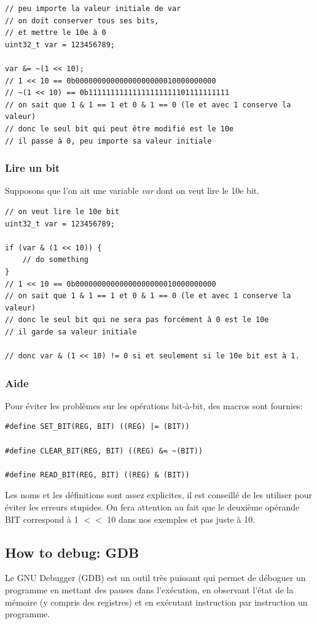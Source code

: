 \documentclass[a4paper,10pt]{article} %
\begin{document}
\begin{lstlisting}[frame=single]
// peu importe la valeur initiale de var
// on doit conserver tous ses bits,
// et mettre le 10e à 0
uint32_t var = 123456789;

var &= ~(1 << 10);
// 1 << 10 == 0b00000000000000000000010000000000
// ~(1 << 10) == 0b11111111111111111111101111111111
// on sait que 1 & 1 == 1 et 0 & 1 == 0 (le et avec 1 conserve la valeur)
// donc le seul bit qui peut être modifié est le 10e
// il passe à 0, peu importe sa valeur initiale
\end{lstlisting}

\subsubsection{Lire un bit}
Supposons que l'on ait une variable \textit{var} dont on veut lire le 10e bit.

\begin{lstlisting}[frame=single]
// on veut lire le 10e bit
uint32_t var = 123456789;

if (var & (1 << 10)) {
    // do something
}
// 1 << 10 == 0b00000000000000000000010000000000
// on sait que 1 & 1 == 1 et 0 & 1 == 0 (le et avec 1 conserve la valeur)
// donc le seul bit qui ne sera pas forcément à 0 est le 10e
// il garde sa valeur initiale

// donc var & (1 << 10) != 0 si et seulement si le 10e bit est à 1.
\end{lstlisting}

\subsubsection{Aide}
Pour éviter les problèmes sur les opérations bit-à-bit, des macros sont fournies:

\begin{lstlisting}[frame=single]
#define SET_BIT(REG, BIT) ((REG) |= (BIT))

#define CLEAR_BIT(REG, BIT) ((REG) &= ~(BIT))

#define READ_BIT(REG, BIT) ((REG) & (BIT))
\end{lstlisting}

Les noms et les définitions sont assez explicites, il est conseillé de les utiliser pour éviter les erreurs stupides. On fera attention au fait que le deuxième opérande BIT correspond à 1 $<<$ 10 dans nos exemples et pas juste à 10.

\subsection{How to debug: GDB}
Le GNU Debugger (GDB) est un outil très puissant qui permet de déboguer un programme en mettant des pauses dans l’exécution, en observant l'état de la mémoire (y compris des registres) et en exécutant instruction par instruction un programme.\\
\end{document}
